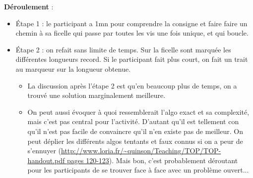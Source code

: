 \documentclass{article}
\newcommand{\titre}[1]{\medskip\noindent\textbf{#1} : }
\newcommand{\deroulement}{\titre{Déroulement}}
\begin{document}
\deroulement
\begin{itemize}
\item Étape 1 : le participant a 1mn pour comprendre la consigne et faire faire
un chemin à sa ficelle qui passe par toutes les vis une fois unique, et qui
boucle.
\item Étape 2 : on refait sans limite de temps. Sur la ficelle sont marquée les
différentes longueurs record. Si le participant fait plus court, on fait un
trait au marqueur sur la longueur obtenue.
\begin{itemize}
\item La discussion après l'étape 2 est qu'en beaucoup plus de temps, on a
trouvé une solution marginalement meilleure. 
\item On peut aussi évoquer à quoi ressemblerait l'algo exact et sa complexité,
mais c'est pas central pour l'activité. D'autant qu'il est tellement con qu'il
n'est pas facile de convaincre qu'il n'en existe pas de meilleur. On peut
déplier les différents algos tentants et faux connus si on a peur de s'ennuyer
(\url{http://www.loria.fr/~quinson/Teaching/TOP/TOP-handout.pdf pages
120-123}). Mais bon, c'est probablement déroutant pour les participants de se
trouver face à face avec un problème ouvert...


\end{itemize}
\end{itemize}
\end{document}
